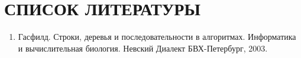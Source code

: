 \newpage
\section{СПИСОК ЛИТЕРАТУРЫ}
\begin{enumerate}
\item \label{sources:source1}Гасфилд. Строки, деревья и последовательности в алгоритмах. Информатика и вычислительная биология. Невский Диалект БВХ-Петербург, 2003.
\end{enumerate}